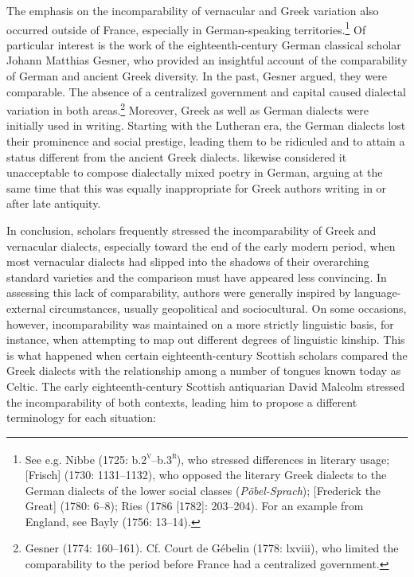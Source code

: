 \documentclass[output=paper]{langsci/langscibook}
\begin{document}
The emphasis on the incomparability of vernacular and Greek variation also occurred outside of France, especially in German-speaking territories.\footnote{See e.g. Nibbe (1725: b.2\textsc{\textsuperscript{v}}\textsc{–}b.3\textsc{\textsuperscript{r}}), who stressed differences in literary usage; [Frisch] (1730: 1131–1132), who opposed the literary Greek dialects to the German dialects of the lower social classes (\textit{Pöbel-Sprach}); [Frederick the Great] (1780: 6–8); Ries (1786 [1782]: 203–204). For an example from England, see Bayly (1756: 13–14).} Of particular interest is the work of the eighteenth-century German classical scholar Johann Matthias Gesner, who provided an insightful account of the comparability of German and ancient Greek diversity. In the past, Gesner argued, they were comparable. The absence of a centralized government and capital caused dialectal variation in both areas.\footnote{Gesner (1774: 160–161). Cf. Court de Gébelin (1778: lxviii), who limited the comparability to the period before France had a centralized government.} Moreover, Greek as well as German dialects were initially used in writing. Starting with the Lutheran era, the German dialects lost their prominence and social prestige, leading them to be ridiculed and to attain a status different from the ancient Greek dialects. \citet[162]{Gesner1774} likewise considered it unacceptable to compose dialectally mixed poetry in German, arguing at the same time that this was equally inappropriate for Greek authors writing in or after late antiquity.

In conclusion, scholars frequently stressed the incomparability of Greek and vernacular dialects, especially toward the end of the early modern period, when most vernacular dialects had slipped into the shadows of their overarching standard varieties and the comparison must have appeared less convincing. In assessing this lack of comparability, authors were generally inspired by language-external circumstances, usually geopolitical and sociocultural. On some occasions, however, incomparability was maintained on a more strictly linguistic basis, for instance, when attempting to map out different degrees of linguistic kinship. This is what happened when certain eighteenth-century Scottish scholars compared the Greek dialects with the relationship among a number of tongues known today as Celtic. The early eighteenth-century Scottish antiquarian David Malcolm stressed the incomparability of both contexts, leading him to propose a different terminology for each situation:
\end{document}
